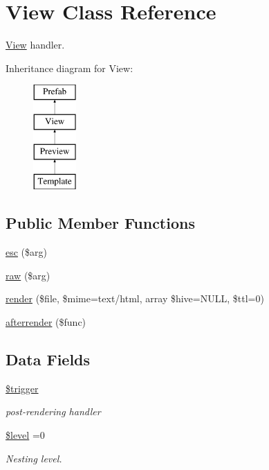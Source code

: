 \hypertarget{class_view}{}\section{View Class Reference}
\label{class_view}


\hyperlink{class_view}{View} handler.  


Inheritance diagram for View\+:\begin{figure}[H]
\begin{center}
\leavevmode
\includegraphics[height=4.000000cm]{class_view}
\end{center}
\end{figure}
\subsection*{Public Member Functions}
\begin{DoxyCompactItemize}
\item 
\hyperlink{class_view_a5bd4df9fdd31ef4ff4e020a04245a34b}{esc} (\$arg)
\item 
\hyperlink{class_view_ae28ae43a12ee2a48b262f167ec9042da}{raw} (\$arg)
\item 
\hyperlink{class_view_a23250d5899cf83753ce12eb47b41ecfb}{render} (\$file, \$mime=\textquotesingle{}text/html\textquotesingle{}, array \$hive=N\+U\+LL, \$ttl=0)
\item 
\hyperlink{class_view_a26528971a7a6dec321d8c96fc4e28d58}{afterrender} (\$func)
\end{DoxyCompactItemize}
\subsection*{Data Fields}
\begin{DoxyCompactItemize}
\item 
\hypertarget{class_view_ae4c540bb943eedf48dbc7d06b2994a05}{}\label{class_view_ae4c540bb943eedf48dbc7d06b2994a05} 
\hyperlink{class_view_ae4c540bb943eedf48dbc7d06b2994a05}{\$trigger}
\begin{DoxyCompactList}\small\item\em post-\/rendering handler \end{DoxyCompactList}\item 
\hypertarget{class_view_abd32cc82c6a3f79491987de36ad580ca}{}\label{class_view_abd32cc82c6a3f79491987de36ad580ca} 
\hyperlink{class_view_abd32cc82c6a3f79491987de36ad580ca}{\$level} =0
\begin{DoxyCompactList}\small\item\em Nesting level. \end{DoxyCompactList}\end{DoxyCompactItemize}
